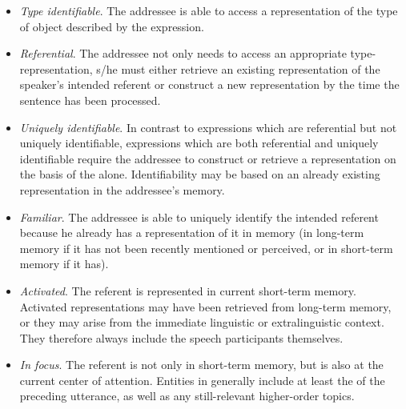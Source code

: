 \begin{itemize}
\item \textit{Type identifiable}. The addressee is able to access a representation of the type of object described by the expression.
\item \textit{Referential}. The addressee not only needs to access an appropriate type-representation, s/he must either retrieve an existing representation of the speaker's intended referent or construct a new representation by the time the sentence has been processed. 
\item\textit{Uniquely identifiable}. In contrast to expressions which are referential but not uniquely identifiable, expressions which are both referential and uniquely identifiable require the addressee to construct or retrieve a representation on the basis of the  alone. Identifiability may be based on an already existing representation in the addressee's memory. 
\item \textit{Familiar}. The addressee is able to uniquely identify the intended referent because he already has a representation of it in memory (in long-term memory if it has not been recently mentioned or perceived, or in short-term memory if it has). 
\item \textit{Activated}. The referent is represented in current short-term memory. Activated representations may have been retrieved from long-term memory, or they may arise from the immediate linguistic or extralinguistic context. They therefore always include the speech participants themselves.
\item \textit{In focus}. The referent is not only in short-term memory, but is also at the current center of attention. Entities in  generally include at least the  of the preceding utterance, as well as any still-relevant higher-order topics.
\end{itemize}
\z



